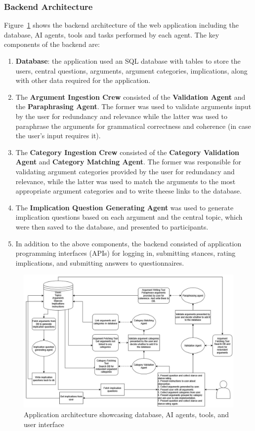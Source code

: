 \documentclass{scrartcl}
\begin{document}
\subsubsection{Backend Architecture}
\label{section:backend-architecture}
Figure~\ref{figure:application-architecture} shows the backend architecture of the web application including the database, AI agents, tools and tasks performed by each agent. The key components of the backend are:
\begin{enumerate}
    \item \textbf{Database}: the application used an SQL database with tables to store the users, central questions, arguments, argument categories, implications, along with other data required for the application.
    \item The \textbf{Argument Ingestion Crew} consisted of the \textbf{Validation Agent} and the \textbf{Paraphrasing Agent}. The former was used to validate arguments input by the user for redundancy and relevance while the latter was used to paraphrase the arguments for grammatical correctness and coherence (in case the user's input requires it).
    \item The \textbf{Category Ingestion Crew} consisted of the \textbf{Category Validation Agent} and \textbf{Category Matching Agent}. The former was responsible for validating argument categories provided by the user for redundancy and relevance, while the latter was used to match the arguments to the most appropriate argument categories and to write theese links to the database.
    \item The \textbf{Implication Question Generating Agent} was used to generate implication questions based on each argument and the central topic, which were then saved to the database, and presented to participants.
    \item In addition to the above components, the backend consisted of application programming interfaces (APIs) for logging in, submitting stances, rating implications, and submitting answers to questionnaires.
\end{enumerate}
\begin{figure}
	\begin{center}
		\includegraphics[scale=0.4]{fig/IHP_architecture.jpg}
	\end{center}
	\caption{Application architecture showcasing database, AI agents, tools, and user interface}
	\label{figure:application-architecture}
\end{figure}
\end{document}
